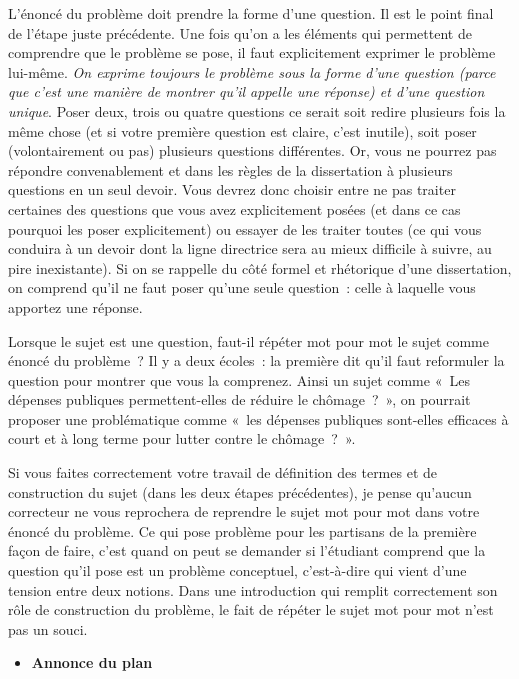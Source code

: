 \documentclass[
  letterpaper,
  DIV=11,
  numbers=noendperiod]{scrartcl}
\providecommand{\tightlist}{%
  \setlength{\itemsep}{0pt}\setlength{\parskip}{0pt}}\usepackage{longtable,booktabs,array}
\begin{document}
L'énoncé du problème doit prendre la forme d'une question. Il est le
point final de l'étape juste précédente. Une fois qu'on a les éléments
qui permettent de comprendre que le problème se pose, il faut
explicitement exprimer le problème lui-même. \emph{On exprime toujours
le problème sous la forme d'une question (parce que c'est une manière de
montrer qu'il appelle une réponse) et d'une question unique}. Poser
deux, trois ou quatre questions ce serait soit redire plusieurs fois la
même chose (et si votre première question est claire, c'est inutile),
soit poser (volontairement ou pas) plusieurs questions différentes. Or,
vous ne pourrez pas répondre convenablement et dans les règles de la
dissertation à plusieurs questions en un seul devoir. Vous devrez donc
choisir entre ne pas traiter certaines des questions que vous avez
explicitement posées (et dans ce cas pourquoi les poser explicitement)
ou essayer de les traiter toutes (ce qui vous conduira à un devoir dont
la ligne directrice sera au mieux difficile à suivre, au pire
inexistante). Si on se rappelle du côté formel et rhétorique d'une
dissertation, on comprend qu'il ne faut poser qu'une seule question~:
celle à laquelle vous apportez une réponse.

Lorsque le sujet est une question, faut-il répéter mot pour mot le sujet
comme énoncé du problème~? Il y a deux écoles~: la première dit qu'il
faut reformuler la question pour montrer que vous la comprenez. Ainsi un
sujet comme «~Les dépenses publiques permettent-elles de réduire le
chômage~?~», on pourrait proposer une problématique comme «~les dépenses
publiques sont-elles efficaces à court et à long terme pour lutter
contre le chômage~?~».

Si vous faites correctement votre travail de définition des termes et de
construction du sujet (dans les deux étapes précédentes), je pense
qu'aucun correcteur ne vous reprochera de reprendre le sujet mot pour
mot dans votre énoncé du problème. Ce qui pose problème pour les
partisans de la première façon de faire, c'est quand on peut se demander
si l'étudiant comprend que la question qu'il pose est un problème
conceptuel, c'est-à-dire qui vient d'une tension entre deux notions.
Dans une introduction qui remplit correctement son rôle de construction
du problème, le fait de répéter le sujet mot pour mot n'est pas un
souci.

\begin{itemize}
\tightlist
\item
  \textbf{Annonce du plan}
\end{itemize}
\end{document}
